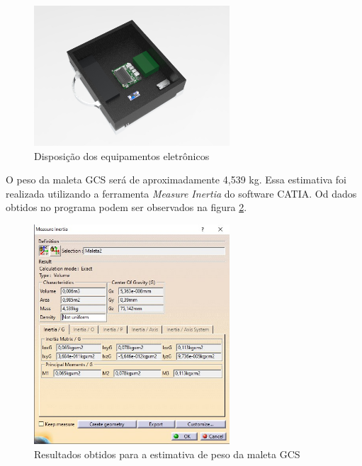 \begin{figure}[H]
\centering
\includegraphics[width=0.65\textwidth]{figuras/Disposicao dos componentes.16.jpg}
\caption{Disposição dos equipamentos eletrônicos}
\label{fig:Disposicao dos Componentes}
\end{figure}

\par O peso da maleta GCS será de aproximadamente 4,539 kg. Essa estimativa foi realizada utilizando a ferramenta \textit{Measure Inertia} do software CATIA. Od dados obtidos no programa podem ser observados na  figura \ref{fig:PesoMGCS}.

\begin{figure}[H]
\centering
\includegraphics[width=0.65\textwidth]{figuras/PesoMGCS.jpg}
\caption{Resultados obtidos para a estimativa de peso da maleta GCS}
\label{fig:PesoMGCS}
\end{figure}

